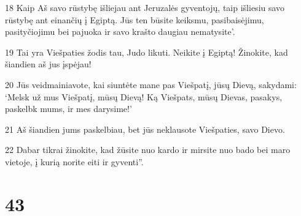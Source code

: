 \par 18 Kaip Aš savo rūstybę išliejau ant Jeruzalės gyventojų, taip išliesiu savo rūstybę ant einančių į Egiptą. Jūs ten būsite keiksmu, pasibaisėjimu, pasityčiojimu bei pajuoka ir savo krašto daugiau nematysite’. 
\par 19 Tai yra Viešpaties žodis tau, Judo likuti. Neikite į Egiptą! Žinokite, kad šiandien aš jus įspėjau! 
\par 20 Jūs veidmainiavote, kai siuntėte mane pas Viešpatį, jūsų Dievą, sakydami: ‘Melsk už mus Viešpatį, mūsų Dievą! Ką Viešpats, mūsų Dievas, pasakys, paskelbk mums, ir mes darysime!’ 
\par 21 Aš šiandien jums paskelbiau, bet jūs neklausote Viešpaties, savo Dievo. 
\par 22 Dabar tikrai žinokite, kad žūsite nuo kardo ir mirsite nuo bado bei maro vietoje, į kurią norite eiti ir gyventi”.



\chapter{43}


